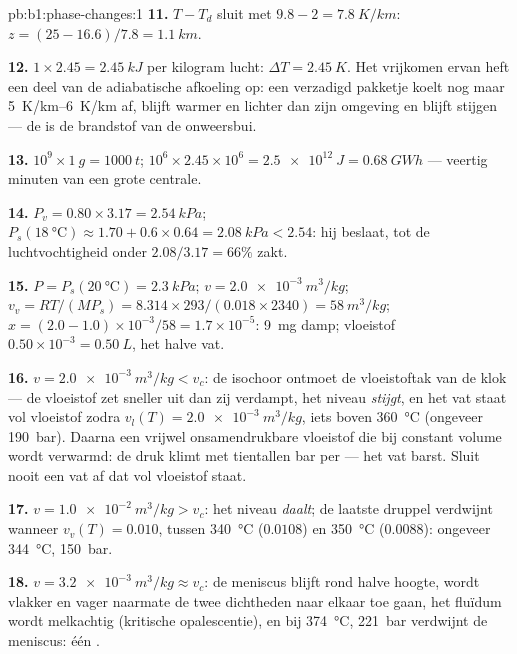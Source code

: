 \begin{solution}{pb:b1:phase-changes:1}
\textbf{11.} $T - T_d$ sluit met $9.8 - 2 = \qty{7.8}{K/km}$: $z = (25 - 16.6)/
7.8 = \qty{1.1}{km}$.

\textbf{12.} $1 \times 2.45 = \qty{2.45}{kJ}$ per kilogram lucht: $\Delta T =
\qty{2.45}{K}$. Het vrijkomen ervan heft een deel van de adiabatische afkoeling op: een
verzadigd pakketje koelt nog maar \qtyrange{5}{6}{K/km} af, blijft warmer en
lichter dan zijn omgeving en blijft stijgen --- de  is
de brandstof van de onweersbui.

\textbf{13.} $10^9 \times \qty{1}{g} = \qty{1000}{t}$; $10^6 \times 2.45 \times 10^6 =
\qty{2.5e12}{J} = \qty{0.68}{GW h}$ --- veertig minuten van een grote centrale.

\textbf{14.} $P_v = 0.80 \times 3.17 = \qty{2.54}{kPa}$; $P_s(\qty{18}{\degreeCelsius})
\approx 1.70 + 0.6 \times 0.64 = \qty{2.08}{kPa} < 2.54$: hij beslaat, tot de
luchtvochtigheid onder $2.08/3.17 = 66\%$ zakt.

\textbf{15.} $P = P_s(\qty{20}{\degreeCelsius}) = \qty{2.3}{kPa}$; $v = \qty{2.0e-3}{m^3/kg}$;
$v_v = RT/(MP_s) = 8.314 \times 293/(0.018 \times 2340) = \qty{58}{m^3/kg}$; $x =
(2.0 - 1.0) \times 10^{-3}/58 = 1.7 \times 10^{-5}$: \qty{9}{mg} damp;
vloeistof $0.50 \times 10^{-3} = \qty{0.50}{L}$, het halve vat.

\textbf{16.} $v = \qty{2.0e-3}{m^3/kg} < v_c$: de isochoor ontmoet de vloeistoftak
van de klok --- de vloeistof zet sneller uit dan zij verdampt, het
niveau \emph{stijgt}, en het vat staat vol vloeistof zodra $v_l(T) =
\qty{2.0e-3}{m^3/kg}$, iets boven \qty{360}{\degreeCelsius} (ongeveer
\qty{190}{bar}). Daarna een vrijwel onsamendrukbare vloeistof die bij constant
volume wordt verwarmd: de druk klimt met tientallen bar per  --- het vat
barst. Sluit nooit een vat af dat vol vloeistof staat.

\textbf{17.} $v = \qty{1.0e-2}{m^3/kg} > v_c$: het niveau \emph{daalt}; de laatste
druppel verdwijnt wanneer $v_v(T) = 0.010$, tussen \qty{340}{\degreeCelsius} ($0.0108$)
en \qty{350}{\degreeCelsius} ($0.0088$): ongeveer \qty{344}{\degreeCelsius},
\qty{150}{bar}.

\textbf{18.} $v = \qty{3.2e-3}{m^3/kg} \approx v_c$: de meniscus blijft rond
halve hoogte, wordt vlakker en vager naarmate de twee dichtheden naar elkaar toe gaan,
het fluïdum wordt melkachtig (kritische opalescentie), en bij \qty{374}{\degreeCelsius},
\qty{221}{bar} verdwijnt de meniscus: één .


\end{solution}
